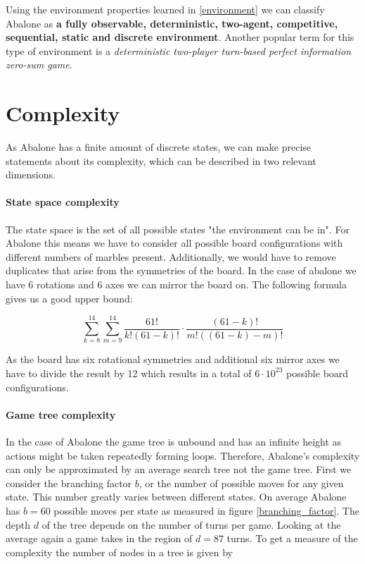 Using the environment properties learned in \ref{environment} we can classify Abalone as \textbf{a fully observable, deterministic, two-agent, competitive, sequential, static and discrete environment}. Another popular term for this type of environment is a \textit{deterministic two-player  turn-based perfect information zero-sum game}.

\section{Complexity}
As Abalone has a finite amount of discrete states, we can make precise statements about its complexity, which can be described in two relevant dimensions.

\paragraph{State space complexity}
\label{state_space_complexity}

The state space is the set of all possible states "the environment can be in".\cite[p. 150]{russell_artificial_2021} For Abalone this means we have to consider all possible board configurations with different numbers of marbles present. Additionally, we would have to remove duplicates that arise from the symmetries of the board. In the case of abalone we have 6 rotations and 6 axes we can mirror the board on. The following formula gives us a good upper bound:

\begin{equation}
    \sum_{k=8}^{14}\sum_{m=9}^{14}\frac{61!}{k!(61-k)!}\cdot\frac{(61-k)!}{m!((61-k)-m)!}
\end{equation}

As the board has six rotational symmetries and additional six mirror axes we have to divide the result by 12 which results in a total of $ 6 \cdot 10^{23} $ possible board configurations. \cite[p. 4]{lemmens_constructing_2005}

\paragraph{Game tree complexity} In the case of Abalone the game tree is unbound and has an infinite height as actions might be taken repeatedly forming loops. Therefore, Abalone's complexity can only be approximated by an average search tree not the game tree. First we consider the branching factor $ b $, or the number of possible moves for any given state. This number greatly varies between different states. On average Abalone has $ b = 60 $ possible moves per state as measured in figure \ref{branching_factor}. The depth $ d $ of the tree depends on the number of turns per game. Looking at the average again a game takes in the region of $ d = 87 $ turns. To get a measure of the complexity the number of nodes in a tree is given by

